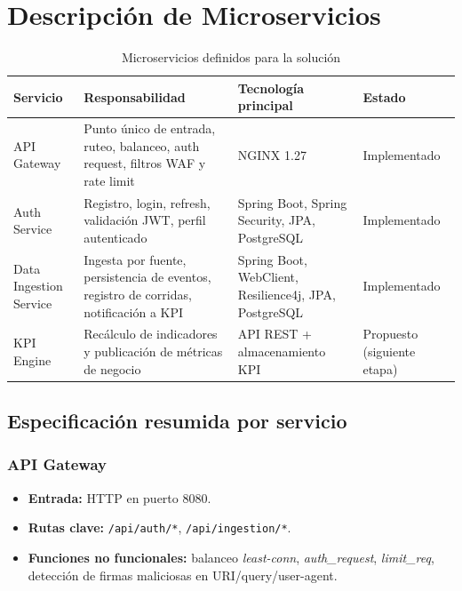 \documentclass[12pt,a4paper]{article}
\begin{document}
\section{Descripción de Microservicios}

\begin{table}[H]
\centering
\begin{tabularx}{\textwidth}{p{}p{}p{}Y}
\toprule
\textbf{Servicio} & \textbf{Responsabilidad} & \textbf{Tecnología principal} & \textbf{Estado} \\
\midrule
API Gateway & Punto único de entrada, ruteo, balanceo, auth request, filtros WAF y rate limit & NGINX 1.27 & Implementado \\
Auth Service & Registro, login, refresh, validación JWT, perfil autenticado & Spring Boot, Spring Security, JPA, PostgreSQL & Implementado \\
Data Ingestion Service & Ingesta por fuente, persistencia de eventos, registro de corridas, notificación a KPI & Spring Boot, WebClient, Resilience4j, JPA, PostgreSQL & Implementado \\
KPI Engine & Recálculo de indicadores y publicación de métricas de negocio & API REST + almacenamiento KPI & Propuesto (siguiente etapa) \\
\bottomrule
\end{tabularx}
\caption{Microservicios definidos para la solución}
\end{table}
\newpage
\subsection{Especificación resumida por servicio}

\subsubsection*{API Gateway}
\begin{itemize}[leftmargin=1.2cm]
  \item \textbf{Entrada:} HTTP en puerto 8080.
  \item \textbf{Rutas clave:} \texttt{/api/auth/*}, \texttt{/api/ingestion/*}.
  \item \textbf{Funciones no funcionales:} balanceo \textit{least-conn}, \textit{auth\_request}, \textit{limit\_req}, detección de firmas maliciosas en URI/query/user-agent.
\end{itemize}
\end{document}
